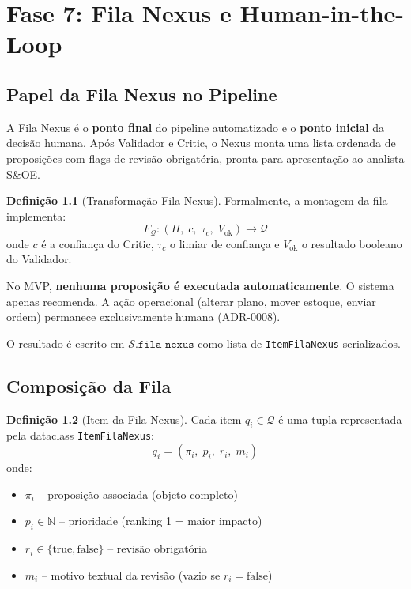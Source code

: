 \documentclass[a4paper, 12pt]{report}
\theoremstyle{definition}
\newtheorem{definicao}{Defini\c{c}\~ao}[chapter]
\theoremstyle{remark}
\newcommand{\N}{\mathbb{N}}
\newcommand{\state}{\mathcal{S}}
\newcommand{\fila}{\mathcal{Q}}
\begin{document}
\chapter{Fase 7: Fila Nexus e Human-in-the-Loop}

\section{Papel da Fila Nexus no Pipeline}

A Fila Nexus \'e o \textbf{ponto final} do pipeline automatizado e o
\textbf{ponto inicial} da decis\~ao humana. Ap\'os Validador e Critic,
o Nexus monta uma lista ordenada de proposi\c{c}\~oes com flags de
revis\~ao obrigat\'oria, pronta para apresenta\c{c}\~ao ao analista S\&OE.

\begin{definicao}[Transforma\c{c}\~ao Fila Nexus]
  Formalmente, a montagem da fila implementa:
  \[
    F_{\fila} : (\Pi,\; c,\; \tau_c,\; V_{\text{ok}}) \to \fila
  \]
  onde $c$ \'e a confian\c{c}a do Critic, $\tau_c$ o limiar de confian\c{c}a
  e $V_{\text{ok}}$ o resultado booleano do Validador.
\end{definicao}

\begin{caixadecisao}
  No MVP, \textbf{nenhuma proposi\c{c}\~ao \'e executada automaticamente}.
  O sistema apenas recomenda. A a\c{c}\~ao operacional (alterar plano,
  mover estoque, enviar ordem) permanece exclusivamente humana
  (ADR-0008).
\end{caixadecisao}

O resultado \'e escrito em $\state.\texttt{fila\_nexus}$ como lista de
\texttt{ItemFilaNexus} serializados.


\section{Composi\c{c}\~ao da Fila}

\begin{definicao}[Item da Fila Nexus]
  Cada item $q_i \in \fila$ \'e uma tupla representada pela dataclass
  \texttt{ItemFilaNexus}:
  \[
    q_i = (\pi_i,\; p_i,\; r_i,\; m_i)
  \]
  onde:
  \begin{itemize}
    \item $\pi_i$ -- proposi\c{c}\~ao associada (objeto completo)
    \item $p_i \in \N$ -- prioridade (ranking 1 = maior impacto)
    \item $r_i \in \{\text{true}, \text{false}\}$ -- revis\~ao obrigat\'oria
    \item $m_i$ -- motivo textual da revis\~ao (vazio se $r_i = \text{false}$)
  \end{itemize}
\end{definicao}
\end{document}
